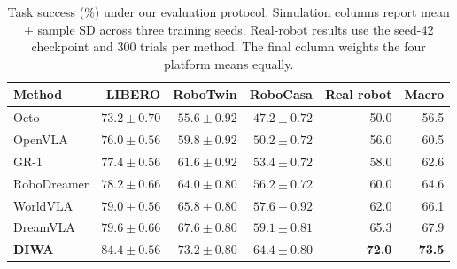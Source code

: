 \begin{table}[t]
\centering
\caption{Task success (\%) under our evaluation protocol. Simulation columns report mean $\pm$ sample SD across three training seeds. Real-robot results use the seed-42 checkpoint and 300 trials per method. The final column weights the four platform means equally.}
\label{tab:main}
\small
\begin{tabular}{lrrrrr}
\toprule
Method & LIBERO & RoboTwin & RoboCasa & Real robot & Macro\\
\midrule
Octo & $73.2 \pm 0.70$ & $55.6 \pm 0.92$ & $47.2 \pm 0.72$ & 50.0 & 56.5\\
OpenVLA & $76.0 \pm 0.56$ & $59.8 \pm 0.92$ & $50.2 \pm 0.72$ & 56.0 & 60.5\\
GR-1 & $77.4 \pm 0.56$ & $61.6 \pm 0.92$ & $53.4 \pm 0.72$ & 58.0 & 62.6\\
RoboDreamer & $78.2 \pm 0.66$ & $64.0 \pm 0.80$ & $56.2 \pm 0.72$ & 60.0 & 64.6\\
WorldVLA & $79.0 \pm 0.56$ & $65.8 \pm 0.80$ & $57.6 \pm 0.92$ & 62.0 & 66.1\\
DreamVLA & $79.6 \pm 0.66$ & $67.6 \pm 0.80$ & $59.1 \pm 0.81$ & 65.3 & 67.9\\
\midrule
\textbf{DIWA} & $\mathbf{84.4 \pm 0.56}$ & $\mathbf{73.2 \pm 0.80}$ & $\mathbf{64.4 \pm 0.80}$ & \textbf{72.0} & \textbf{73.5}\\
\bottomrule
\end{tabular}
\end{table}
